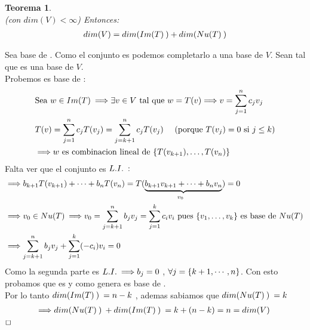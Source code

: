 \documentclass[]{article}
\newtheorem{theorem}{Teorema}
\newenvironment{proof}{\noindent{\bf Prueba:}}{$\hfill \Box$ \vspace{10pt}}
\newcommand{\ida}{\Longrightarrow}
\begin{document}
\begin{theorem}
    \\
    (con $dim(V)<\infty$) Entonces:
    \begin{align*}
        dim(V)=dim(\text{$Im(T)$}\:)+dim(\text{$Nu(T)$}\:)
    \end{align*}
\end{theorem}
\begin{proof}
    Sea  base de . Como el conjunto es \li podemos completarlo
    a una base de $V$. Sean  tal que 
    es una base de $V$.\\
    Probemos  es base de \I :
    \begin{align*}
        &\text{Sea } w \in \I \ida \exists v \in V \text{ tal que } w=\T{v} \ida v=\sum_{j=1}^{n}c_j\vc{j}\\
        &\T{v}=\sum_{j=1}^{n}c_j\T{\vc{j}}=\sum_{j=k+1}^{n}c_j\T{\vc{j}} \quad \text{ (porque $\T{\vc{j}}=0$ si $j\leq k$)}\\
        &\ida w \text{ es combinacion lineal de } \conjunto{\T{\vc{k+1}},\dots,\T{\vc{n}}}  
    \end{align*}
    Falta ver que el conjunto es $L.I.\: :$
    \begin{align*}
        &\ida b_{k+1}\T{\vc{k+1}}+\cdots+b_n\T{\vc{n}}=\underset{\vc{0}}{\T{\underbrace{b_{k+1}v_{k+1}+\cdots+b_nv_n}}}=0\\
        &\ida \vc{0}\in \N \ida \vc{0}=\sum_{j=k+1}^{n}b_jv_j=\sum_{j=1}^{k}c_iv_i
        \text{ pues \conjunto{\vc{1},\dots,\vc{k}} es base de \N}\\
        &\ida \sum_{j=k+1}^{n}b_jv_j+\sum_{j=1}^{k}(-c_i)v_i = 0
    \end{align*}
    Como la segunda parte es $\li \ida b_j=0$ , $\forall j=\text{$\{ {k+1,\cdots,n} \}$}$. Con esto probamos que
     es \li y como genera es base de \I.\\
    Por lo tanto $\text{$dim(\text{$Im(T)$}\:)$}\:=n-k$ , ademas sabiamos que $\text{$dim(\text{$Nu(T)$}\:)$}\:=k$
    \begin{align*}
        \ida \dm{\N}+\dm{\I}=k+(n-k)=n=\dm{V}
    \end{align*}
\end{proof}
\end{document}
